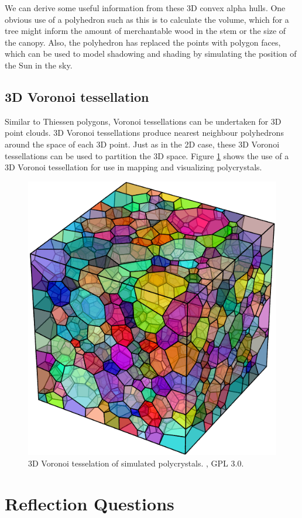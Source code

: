 \documentclass[
]{book}
\begin{document}
We can derive some useful information from these 3D convex alpha hulls. One obvious use of a polyhedron such as this is to calculate the volume, which for a tree might inform the amount of merchantable wood in the stem or the size of the canopy. Also, the polyhedron has replaced the points with polygon faces, which can be used to model shadowing and shading by simulating the position of the Sun in the sky.

\subsection{3D Voronoi tessellation}\label{d-voronoi-tessellation}

Similar to Thiessen polygons, Voronoi tessellations can be undertaken for 3D point clouds. 3D Voronoi tessellations produce nearest neighbour polyhedrons around the space of each 3D point. Just as in the 2D case, these 3D Voronoi tessellations can be used to partition the 3D space. Figure \ref{fig:7-neper} shows the use of a 3D Voronoi tessellation for use in mapping and visualizing polycrystals.



\begin{figure}
\includegraphics[width=0.75\linewidth]{images/07-neper} \caption{3D Voronoi tesselation of simulated polycrystals. \citep{quey_neper_nodate}, GPL 3.0.}\label{fig:7-neper}
\end{figure}

\section*{Reflection Questions}\label{reflection-questions-4}
\end{document}
